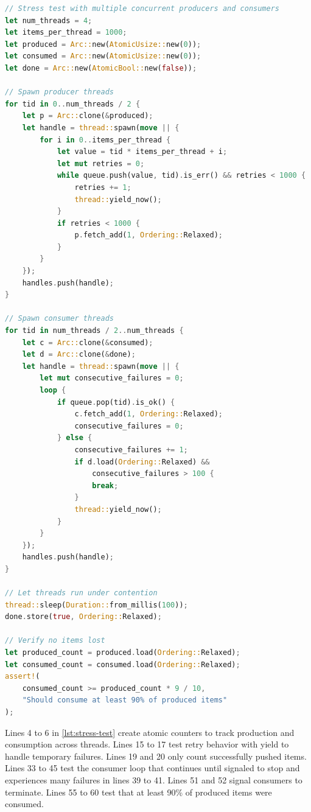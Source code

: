 \begin{lstlisting}[language=Rust, style=boxed, caption={High-contention stress test}, label={lst:stress-test}]
// Stress test with multiple concurrent producers and consumers
let num_threads = 4;
let items_per_thread = 1000;
let produced = Arc::new(AtomicUsize::new(0));
let consumed = Arc::new(AtomicUsize::new(0));
let done = Arc::new(AtomicBool::new(false));

// Spawn producer threads
for tid in 0..num_threads / 2 {
    let p = Arc::clone(&produced);
    let handle = thread::spawn(move || {
        for i in 0..items_per_thread {
            let value = tid * items_per_thread + i;
            let mut retries = 0;
            while queue.push(value, tid).is_err() && retries < 1000 {
                retries += 1;
                thread::yield_now();
            }
            if retries < 1000 {
                p.fetch_add(1, Ordering::Relaxed);
            }
        }
    });
    handles.push(handle);
}

// Spawn consumer threads
for tid in num_threads / 2..num_threads {
    let c = Arc::clone(&consumed);
    let d = Arc::clone(&done);
    let handle = thread::spawn(move || {
        let mut consecutive_failures = 0;
        loop {
            if queue.pop(tid).is_ok() {
                c.fetch_add(1, Ordering::Relaxed);
                consecutive_failures = 0;
            } else {
                consecutive_failures += 1;
                if d.load(Ordering::Relaxed) && 
                    consecutive_failures > 100 {
                    break;
                }
                thread::yield_now();
            }
        }
    });
    handles.push(handle);
}

// Let threads run under contention
thread::sleep(Duration::from_millis(100));
done.store(true, Ordering::Relaxed);

// Verify no items lost
let produced_count = produced.load(Ordering::Relaxed);
let consumed_count = consumed.load(Ordering::Relaxed);
assert!(
    consumed_count >= produced_count * 9 / 10,
    "Should consume at least 90% of produced items"
);
\end{lstlisting}

Lines 4 to 6 in \cref{lst:stress-test} create atomic counters to track production and consumption across threads. Lines 15 to 17 test retry behavior with yield to handle temporary failures. Lines 19 and 20 only count successfully pushed items. Lines 33 to 45 test the consumer loop that continues until signaled to stop and experiences many failures in lines 39 to 41. Lines 51 and 52 signal consumers to terminate. Lines 55 to 60 test that at least 90\% of produced items were consumed.

